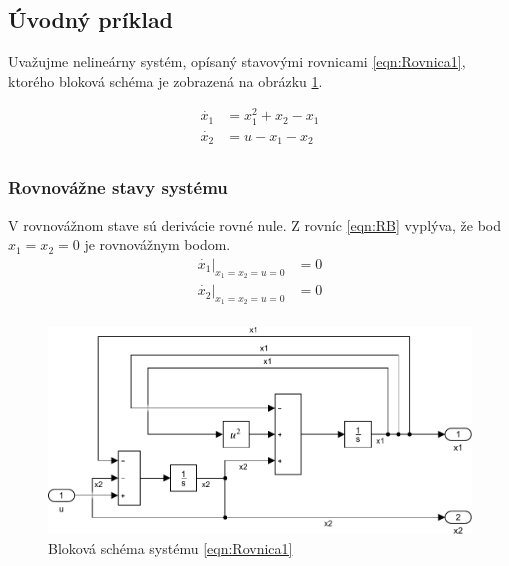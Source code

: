 \documentclass[../main.tex]{subfiles}
\begin{document}
	
\subsection{Úvodný príklad}
Uvažujme nelineárny systém, opísaný stavovými rovnicami \ref{eqn:Rovnica1}, ktorého bloková schéma je zobrazená na obrázku \ref{fig:BlokovaSchemaPr1}. 

\begin{equation}
	\begin{aligned}
	\dot{x_1} &= x_1^2 + x_2 - x_1 \\
	\dot{x_2} &= u - x_1 - x_2 \\
	\end{aligned}
	\label{eqn:Rovnica1}
\end{equation}

\subsubsection{Rovnovážne stavy systému}
V rovnovážnom stave sú derivácie rovné nule. Z rovníc \ref{eqn:RB} vyplýva, že bod $x_1 = x_2 = 0$ je rovnovážnym bodom.
\begin{equation}
\begin{aligned}
    \dot{x_1}|_{x_1 = x_2 = u = 0} &=  0 \\
\dot{x_2}|_{x_1 = x_2 = u = 0} &= 0 \\
\end{aligned}
\label{eqn:RB}
\end{equation}
\begin{figure}[H]
	\begin{center}\includegraphics[scale=0.8]{Rovnica1.pdf}\end{center}
	\caption{Bloková schéma systému \ref{eqn:Rovnica1}}
	\label{fig:BlokovaSchemaPr1}
\end{figure}
\end{document}
